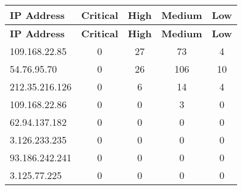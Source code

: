 \documentclass{article}
\begin{document}
\begin{longtable}{|>{\raggedright\arraybackslash}p{3cm}|c|c|c|c|}
    \hline
    \textbf{IP Address} & \textbf{Critical} & \textbf{High} & \textbf{Medium} & \textbf{Low} \\
    \hline
    \endfirsthead
    \hline
    \textbf{IP Address} & \textbf{Critical} & \textbf{High} & \textbf{Medium} & \textbf{Low} \\
    \hline
    \endhead
    \hline
    \endfoot
    \endlastfoot
    
    
    
    \rowcolor{lightred} %
    
    109.168.22.85 & 0 & 27 & 73 & 4 \\
    \hline
    
    
    \rowcolor{lightred} %
    
    54.76.95.70 & 0 & 26 & 106 & 10 \\
    \hline
    
    
    \rowcolor{lightred} %
    
    212.35.216.126 & 0 & 6 & 14 & 4 \\
    \hline
    
    
    \rowcolor{lightyellow} %
    
    109.168.22.86 & 0 & 0 & 3 & 0 \\
    \hline
    
    
    \rowcolor{lightgreen} %
    
    62.94.137.182 & 0 & 0 & 0 & 0 \\
    \hline
    
    
    \rowcolor{lightgreen} %
    
    3.126.233.235 & 0 & 0 & 0 & 0 \\
    \hline
    
    
    \rowcolor{lightgreen} %
    
    93.186.242.241 & 0 & 0 & 0 & 0 \\
    \hline
    
    
    \rowcolor{lightgreen} %
    
    3.125.77.225 & 0 & 0 & 0 & 0 \\
    \hline
    

\end{longtable}
\end{document}
